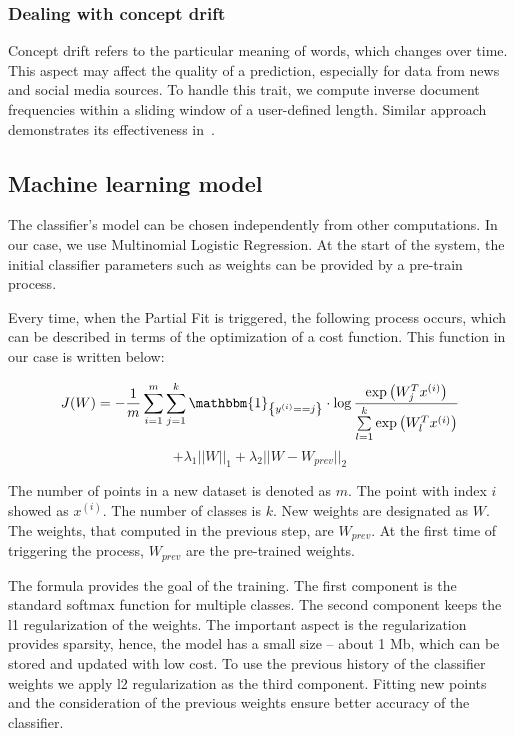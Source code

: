 \subsubsection{Dealing with concept drift}

Concept drift refers to the particular meaning of words, which changes over time. This aspect may affect the quality of a prediction, especially for data from news and social media sources. To handle this trait, we compute inverse document frequencies within a sliding window of a user-defined length. Similar approach demonstrates its effectiveness in~\cite{klinkenberg2000detecting}.

\subsection{Machine learning model \label{ML}}

The classifier's model can be chosen independently from other computations. In our case, we use Multinomial Logistic Regression. At the start of the system, the initial classifier parameters such as weights can be provided by a pre-train process.

Every time, when the Partial Fit is triggered, the following process occurs, which can be described in terms of the optimization of a cost function. This function in our case is written below:

\begin{center}

$$ J(W) = -\frac{1}{m} \sum \limits_{i = 1}^{m} \sum \limits_{j = 1}^{k} \mathbbm{1}_{\left\{y^{(i)} == j\right\}} \cdot \log \frac{\exp\left({W_{j}^Tx^{(i)}}\right) }{\sum \limits_{l = 1}^{k}  \exp\left({W_{l}^Tx^{(i)}}\right) }$$ 
 $$ +  \lambda_1 ||W||_1 + \lambda_2 ||W - W_{prev}||_2 $$

\end{center} 

The number of points in a new dataset is denoted as $m$. The point with index $i$ showed as $x^{(i)}$. The number of classes is $k$. New weights are designated as $W$. The weights, that computed in the previous step, are $W_{prev}$. At the first time of triggering the process, $W_{prev}$ are the pre-trained weights. 

The formula provides the goal of the training. The first component is the standard softmax function for multiple classes. The second component keeps the l1 regularization of the weights. The important aspect is the regularization provides sparsity, hence, the model has a small size -- about 1 Mb, which can be stored and updated with low cost. To use the previous history of the classifier weights we apply l2 regularization as the third component. Fitting new points and the consideration of the previous weights ensure better accuracy of the classifier.

